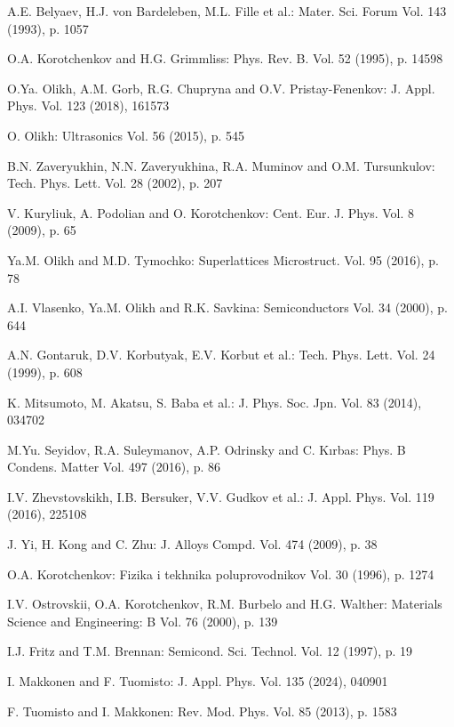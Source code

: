 \documentclass{ttp}
\begin{document}
\begin{thebibliography}{99}
 A.E. Belyaev, H.J. von Bardeleben, M.L. Fille et al.: Mater. Sci. Forum Vol. 143 (1993), p. 1057

 O.A. Korotchenkov and H.G. Grimmliss: Phys. Rev. B. Vol. 52 (1995), p. 14598

  O.Ya. Olikh, A.M. Gorb, R.G. Chupryna and O.V. Pristay-Fenenkov: J. Appl. Phys. Vol. 123 (2018), 161573

 O. Olikh: Ultrasonics Vol. 56 (2015), p. 545

 B.N. Zaveryukhin, N.N. Zaveryukhina, R.A. Muminov and O.M. Tursunkulov: Tech. Phys. Lett. Vol. 28 (2002), p. 207

 V. Kuryliuk, A. Podolian and O. Korotchenkov: Cent. Eur. J. Phys. Vol. 8 (2009), p. 65

 Ya.M. Olikh and M.D. Tymochko: Superlattices Microstruct. Vol. 95 (2016), p. 78

 A.I. Vlasenko,  Ya.M. Olikh  and R.K. Savkina: Semiconductors Vol. 34 (2000), p. 644

 A.N. Gontaruk,  D.V. Korbutyak, E.V. Korbut et al.: Tech. Phys. Lett. Vol. 24 (1999), p. 608

 K. Mitsumoto, M. Akatsu, S. Baba et al.: J. Phys. Soc. Jpn. Vol. 83 (2014), 034702

 M.Yu. Seyidov, R.A. Suleymanov, A.P. Odrinsky and C. Kırbas: Phys. B Condens. Matter Vol. 497 (2016), p. 86

 I.V. Zhevstovskikh, I.B. Bersuker, V.V. Gudkov et al.: J. Appl. Phys. Vol. 119 (2016), 225108

 J. Yi, H. Kong and C. Zhu: J. Alloys Compd. Vol. 474 (2009), p. 38

 O.A. Korotchenkov: Fizika i tekhnika poluprovodnikov Vol. 30 (1996), p. 1274

 I.V. Ostrovskii, O.A. Korotchenkov, R.M. Burbelo and H.G. Walther: Materials Science and Engineering: B Vol. 76 (2000), p. 139

 I.J. Fritz and T.M. Brennan: Semicond. Sci. Technol. Vol. 12 (1997), p. 19

 I. Makkonen and F. Tuomisto: J. Appl. Phys. Vol. 135 (2024), 040901

 F. Tuomisto and I. Makkonen: Rev. Mod. Phys. Vol. 85 (2013), p. 1583


\end{thebibliography}
\end{document}
